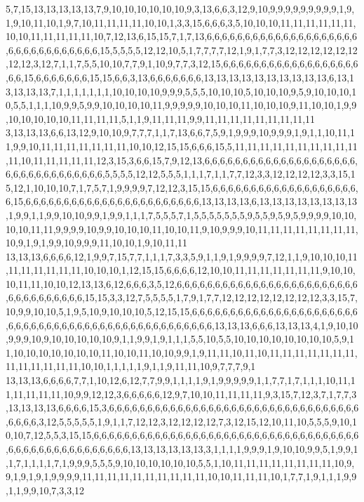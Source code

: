 5,7,15,13,13,13,13,13,7,9,10,10,10,10,10,10,9,3,13,6,6,3,12,9,10,9,9,9,9,9,9,9,9,9,1,9,1,9,10,11,10,1,9,7,10,11,11,11,11,10,10,1,3,3,15,6,6,6,3,5,10,10,10,11,11,11,11,11,11,10,10,11,11,11,11,11,10,7,12,13,6,15,15,7,1,7,13,6,6,6,6,6,6,6,6,6,6,6,6,6,6,6,6,6,6,6,6,6,6,6,6,6,6,6,6,6,6,6,6,15,5,5,5,5,12,12,10,5,1,7,7,7,7,12,1,9,1,7,7,3,12,12,12,12,12,12,12,12,3,12,7,1,1,7,5,5,10,10,7,7,9,1,10,9,7,7,3,12,15,6,6,6,6,6,6,6,6,6,6,6,6,6,6,6,6,6,6,6,6,15,6,6,6,6,6,6,6,15,15,6,6,3,13,6,6,6,6,6,6,6,13,13,13,13,13,13,13,13,13,13,6,13,13,13,13,13,7,1,1,1,1,1,1,1,10,10,10,10,9,9,9,5,5,5,10,10,10,5,10,10,10,9,5,9,10,10,10,10,5,5,1,1,1,10,9,9,5,9,9,10,10,10,10,11,9,9,9,9,9,10,10,10,11,10,10,10,9,11,10,10,1,9,9,10,10,10,10,10,11,11,11,11,5,1,1,9,11,11,11,9,9,11,11,11,11,11,11,11,11,11
3,13,13,13,6,6,13,12,9,10,10,9,7,7,7,1,1,7,13,6,6,7,5,9,1,9,9,9,10,9,9,9,1,9,1,1,10,11,11,9,9,10,11,11,11,11,11,11,11,10,10,12,15,15,6,6,6,15,5,11,11,11,11,11,11,11,11,11,11,11,10,11,11,11,11,11,12,3,15,3,6,6,15,7,9,12,13,6,6,6,6,6,6,6,6,6,6,6,6,6,6,6,6,6,6,6,6,6,6,6,6,6,6,6,6,6,6,6,6,6,5,5,5,5,12,12,5,5,5,1,1,1,7,1,1,7,7,12,3,3,12,12,12,12,3,3,15,15,12,1,10,10,10,7,1,7,5,7,1,9,9,9,9,7,12,12,3,15,15,6,6,6,6,6,6,6,6,6,6,6,6,6,6,6,6,6,6,6,6,15,6,6,6,6,6,6,6,6,6,6,6,6,6,6,6,6,6,6,6,6,6,6,6,13,13,13,13,6,13,13,13,13,13,13,13,13,1,9,9,1,1,9,9,10,10,9,9,1,9,9,1,1,1,7,5,5,5,7,1,5,5,5,5,5,5,5,9,5,5,9,5,9,5,9,9,9,9,10,10,10,10,11,11,9,9,9,9,10,9,9,10,10,10,11,10,10,11,9,10,9,9,9,10,11,11,11,11,11,11,11,11,10,9,1,9,1,9,9,10,9,9,9,11,10,10,1,9,10,11,11
13,13,13,6,6,6,6,12,1,9,9,7,15,7,7,1,1,1,7,3,3,5,9,1,1,9,1,9,9,9,9,7,12,1,1,9,10,10,10,11,11,11,11,11,11,11,10,10,10,1,12,15,15,6,6,6,6,12,10,10,11,11,11,11,11,11,11,9,10,10,10,11,11,10,10,12,13,13,6,12,6,6,6,3,5,12,6,6,6,6,6,6,6,6,6,6,6,6,6,6,6,6,6,6,6,6,6,6,6,6,6,6,6,6,6,6,6,6,6,6,15,15,3,3,12,7,5,5,5,5,1,7,9,1,7,7,12,12,12,12,12,12,12,12,3,3,15,7,10,9,9,10,10,5,1,9,5,10,9,10,10,10,5,12,15,15,6,6,6,6,6,6,6,6,6,6,6,6,6,6,6,6,6,6,6,6,6,6,6,6,6,6,6,6,6,6,6,6,6,6,6,6,6,6,6,6,6,6,6,6,6,6,6,6,6,13,13,13,6,6,6,13,13,13,4,1,9,10,10,9,9,9,10,9,10,10,10,10,10,9,1,1,9,9,1,9,1,1,1,5,5,10,5,5,10,10,10,10,10,10,10,10,5,9,11,10,10,10,10,10,10,10,11,10,10,11,10,10,9,9,1,9,11,11,10,11,10,11,11,11,11,11,11,11,11,11,11,11,11,11,10,10,1,1,1,1,1,9,1,1,9,11,11,10,9,7,7,7,9,1
13,13,13,6,6,6,6,7,7,1,10,12,6,12,7,7,9,9,1,1,1,1,9,1,9,9,9,9,9,1,1,7,7,1,7,1,1,1,10,11,11,11,11,11,11,10,9,9,12,12,3,6,6,6,6,6,12,9,7,10,10,11,11,11,11,9,3,15,7,12,3,7,1,7,7,3,13,13,13,13,6,6,6,6,15,3,6,6,6,6,6,6,6,6,6,6,6,6,6,6,6,6,6,6,6,6,6,6,6,6,6,6,6,6,6,6,6,6,6,6,6,6,6,3,12,5,5,5,5,5,1,9,1,1,7,12,12,3,12,12,12,12,7,3,12,15,12,10,11,10,5,5,5,9,10,10,10,7,12,5,5,3,15,15,6,6,6,6,6,6,6,6,6,6,6,6,6,6,6,6,6,6,6,6,6,6,6,6,6,6,6,6,6,6,6,6,6,6,6,6,6,6,6,6,6,6,6,6,6,6,6,6,6,6,6,13,13,13,13,13,13,3,1,1,1,1,9,9,9,1,9,10,10,9,9,5,1,9,9,1,1,7,1,1,1,1,7,1,9,9,9,5,5,5,9,10,10,10,10,10,10,5,5,1,10,11,11,11,11,11,11,11,11,10,9,9,1,9,1,9,1,9,9,9,9,11,11,11,11,11,11,11,11,11,11,10,10,11,11,11,10,1,7,7,1,9,1,1,1,9,9,1,1,9,9,10,7,3,3,12
